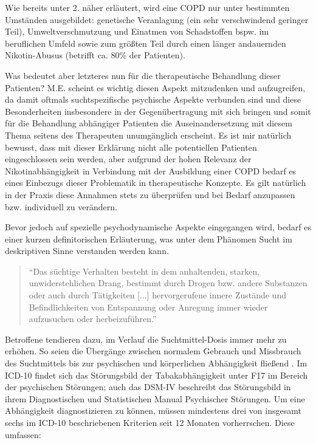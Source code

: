 Wie bereits unter 2. näher erläutert, wird eine COPD nur unter bestimmten Umständen ausgebildet: genetische Veranlagung (ein sehr verschwindend geringer Teil), Umweltverschmutzung und Einatmen von Schadstoffen bspw. im beruflichen Umfeld sowie zum größten Teil durch einen länger andauernden Nikotin-Abusus (betrifft ca. 80\% der Patienten). 

Was bedeutet aber letzteres nun für die therapeutische Behandlung dieser Patienten? M.E. scheint es wichtig diesen Aspekt mitzudenken und aufzugreifen, da damit oftmals  suchtspezifische psychische Aspekte verbunden sind und diese Besonderheiten insbesondere in der Gegenübertragung mit sich bringen und somit für die Behandlung abhängiger Patienten die Auseinandersetzung mit diesem Thema seitens des Therapeuten unumgänglich erscheint. Es ist mir natürlich bewusst, dass mit dieser Erklärung nicht alle potentiellen Patienten eingeschlossen sein werden, aber aufgrund der hohen Relevanz der Nikotinabhängigkeit in Verbindung mit der Ausbildung einer COPD bedarf es eines Einbezugs dieser Problematik in therapeutische Konzepte. Es gilt natürlich in der Praxis diese Annahmen stets zu überprüfen und bei Bedarf anzupassen bzw. individuell zu verändern.

Bevor jedoch auf spezielle psychodynamische Aspekte eingegangen wird, bedarf es einer kurzen definitorischen Erläuterung, was unter dem Phänomen Sucht im deskriptiven Sinne verstanden werden kann. 

\begin{quote}
\onehalfspacing
"`Das süchtige Verhalten besteht in dem anhaltenden, starken, unwiderstehlichen Drang, bestimmt durch Drogen bzw. andere Substanzen oder auch durch Tätigkeiten [...] hervorgerufene innere Zustände und Befindlichkeiten von Entspannung oder Anregung immer wieder aufzusuchen oder herbeizuführen."' \autocite[173]{mentzos2011} 
\end{quote}

Betroffene tendieren dazu, im Verlauf die Suchtmittel-Dosis immer mehr zu erhöhen. So seien die Übergänge zwischen normalem Gebrauch und Missbrauch des Suchtmittels bis zur psychischen und körperlichen Abhängigkeit fließend \autocite[vgl.][173]{mentzos2011}. Im ICD-10 findet sich das Störungsbild der Tabakabhängigkeit unter F17 im Bereich der psychischen Störungen; auch das DSM-IV beschreibt das Störungsbild in ihrem Diagnostischen und Statistischen Manual Psychischer Störungen. Um eine Abhängigkeit diagnostizieren zu können, müssen mindestens drei von insgesamt sechs im ICD-10 beschriebenen Kriterien seit 12 Monaten vorherrschen. Diese umfassen:

